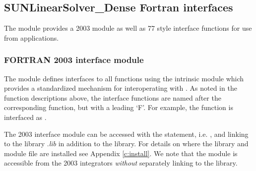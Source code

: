 \subsection{SUNLinearSolver\_Dense Fortran interfaces}
\label{ss:sunlinsol_dense_fortran}

The {\sunlinsoldense} module provides a {\F} 2003 module as well as {\F} 77
style interface functions for use from {\F} applications.

\subsubsection*{FORTRAN 2003 interface module}
The  {\F} module defines interfaces to all
{\sunlinsoldense} {\CC} functions using the intrinsic 
module which provides a standardized mechanism for interoperating with {\CC}. As
noted in the {\CC} function descriptions above, the interface functions are
named after the corresponding {\CC} function, but with a leading `F'. For
example, the function  is interfaced as
.

The {\F} 2003 {\sunlinsoldense} interface module can be accessed with the 
statement, i.e. , and linking to the library
.{\em lib} in addition to the {\CC} library.
For details on where the library and module file
 are installed see Appendix \ref{c:install}.
We note that the module is accessible from the {\F} 2003 {\sundials} integrators
\textit{without} separately linking to the
 library.

